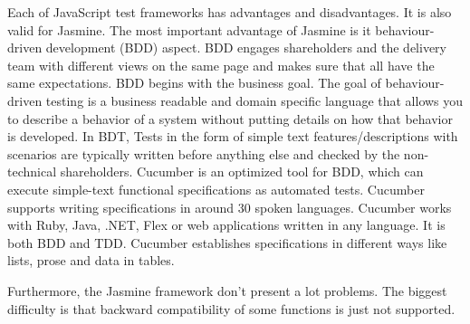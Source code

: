 \documentclass[11pt]{article}
\begin{document}
Each of JavaScript test frameworks has advantages and disadvantages. It is also valid for Jasmine. The most important advantage of Jasmine is it behaviour-driven development (BDD) aspect. BDD engages shareholders and the delivery team with different views on the same page and makes sure that all have the same expectations. BDD begins with the business goal. The goal of behaviour-driven testing is a business readable and domain specific language that allows you to describe a behavior of a system without putting details on how that behavior is developed. In BDT, Tests in the form of simple text features/descriptions with scenarios are typically written before anything else and checked by the non-technical shareholders. Cucumber is an optimized tool for BDD, which can execute simple-text functional specifications as automated tests. Cucumber supports writing specifications in around 30 spoken languages. Cucumber works with Ruby, Java, .NET, Flex or web applications written in any language. It is both BDD and TDD. Cucumber establishes specifications in different ways like lists, prose and data in tables.

Furthermore, the Jasmine framework don't present a lot problems. The biggest difficulty is that backward compatibility of some functions is just not supported. 

\pagebreak
\end{document}
